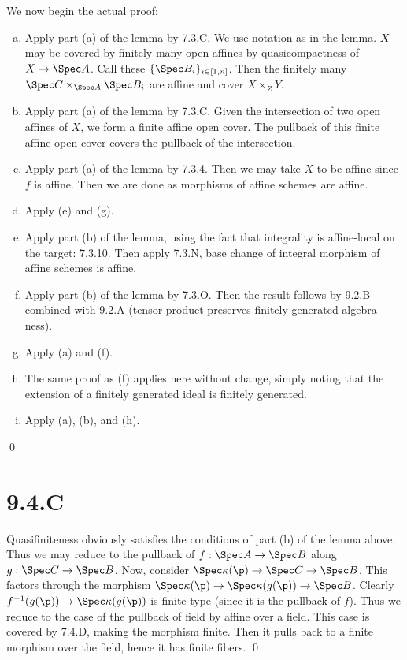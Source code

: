 \documentclass{article}
\begin{document}
We now begin the actual proof:
\begin{enumerate}[a.]
	\item Apply part (a) of the lemma by 7.3.C. We use notation as in the lemma.
	      $X$ may be covered by finitely many open affines by
	      quasicompactness of $X \to \Spec A$. Call these $\{\Spec B_i\}_{i \in [1, n]}$.
	      Then the finitely many $\Spec C \times_{\Spec A} \Spec B_i$ are affine and cover
	      $X \times_ZY$.

	\item Apply part (a) of the lemma by 7.3.C. Given the intersection of two open
	      affines of $X$, we form a finite affine open cover. The
	      pullback of this finite affine open cover covers the pullback of the
	      intersection.
	\item Apply part (a) of the lemma by 7.3.4. Then we may take $X$
	      to be affine since $f$ is affine. Then we are done as
	      morphisms of affine schemes are affine.
	\item Apply (e) and (g).
	\item Apply part (b) of the lemma, using the fact that integrality is affine-local on
	      the target: 7.3.10. Then apply 7.3.N, base change of integral morphism of
	      affine schemes is affine.
	\item Apply part (b) of the lemma by 7.3.O. Then the result follows by 9.2.B combined
	      with 9.2.A (tensor product preserves finitely generated algebra-ness).
	\item Apply (a) and (f).
	\item The same proof as (f) applies here without change, simply noting that the
	      extension of a finitely generated ideal is finitely generated.
	\item Apply (a), (b), and (h).
\end{enumerate} \qed

\section{9.4.C}
Quasifiniteness obviously satisfies the conditions of part (b) of the lemma
above. Thus we may reduce to the pullback of $f: \Spec A \to \Spec B$ along
$g: \Spec C \to \Spec B$. Now, consider $\Spec \kappa(\p) \to \Spec C \to \Spec B$. This factors
through the morphism $\Spec \kappa(\p) \to \Spec \kappa(g(\p)) \to \Spec B$. Clearly $f^{-1}(g(\p)) \to \Spec \kappa(g(\p))$
is finite type (since it is the pullback of $f$). Thus we
reduce to the case of the pullback of field by affine over a field. This case
is covered by 7.4.D, making the morphism finite. Then it pulls back to a finite
morphism over the field, hence it has finite fibers. \qed
\end{document}
